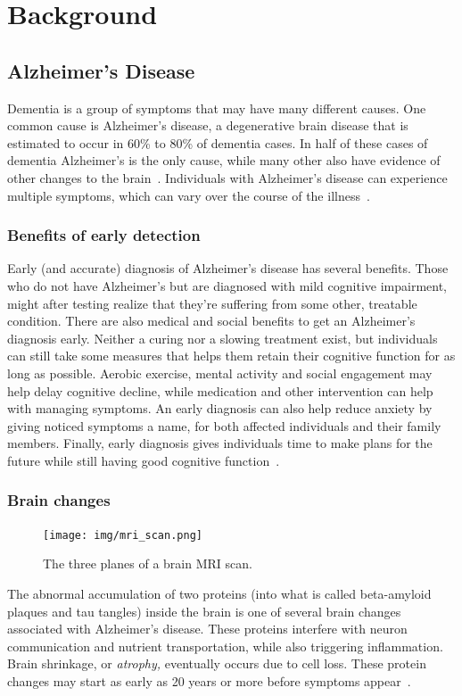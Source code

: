 \documentclass{kththesis}
\begin{document}
\chapter{Background}

\section{Alzheimer's Disease}

Dementia is a group of symptoms that may have many different causes. One common cause is Alzheimer's disease, a degenerative brain disease that is estimated to occur in 60\% to 80\% of dementia cases. In half of these cases of dementia Alzheimer's is the only cause, while many other also have evidence of other changes to the brain~\cite{factsfigures2018}.
Individuals with Alzheimer's disease can experience multiple symptoms, which can vary over the course of the illness~\cite{factsfigures2018}.

\subsection{Benefits of early detection}
Early (and accurate) diagnosis of Alzheimer's disease has several benefits. Those who do not have Alzheimer's but are diagnosed with mild cognitive impairment, might after testing realize that they're suffering from some other, treatable condition. There are also medical and social benefits to get an Alzheimer's diagnosis early. Neither a curing nor a slowing treatment exist, but individuals can still take some measures that helps them retain their cognitive function for as long as possible. Aerobic exercise, mental activity and social engagement may help delay cognitive decline, while medication and other intervention can help with managing symptoms. An early diagnosis can also help reduce anxiety by giving noticed symptoms a name, for both affected individuals and their family members. Finally, early diagnosis gives individuals time to make plans for the future while still having good cognitive function~\cite[p. 406-409]{factsfigures2018}.

\subsection{Brain changes}
\begin{figure}
  \centering
  \texttt{[image: img/mri\_scan.png]}
  \caption{The three planes of a brain MRI scan.}
\end{figure}
The abnormal accumulation of two proteins (into what is called beta-amyloid plaques and tau tangles) inside the brain is one of several brain changes associated with Alzheimer's disease. These proteins interfere with neuron communication and nutrient transportation, while also triggering inflammation. Brain shrinkage, or \textit{atrophy,} eventually occurs due to cell loss. These protein changes may start as early as 20 years or more before symptoms appear~\cite{factsfigures2018}.
\end{document}

